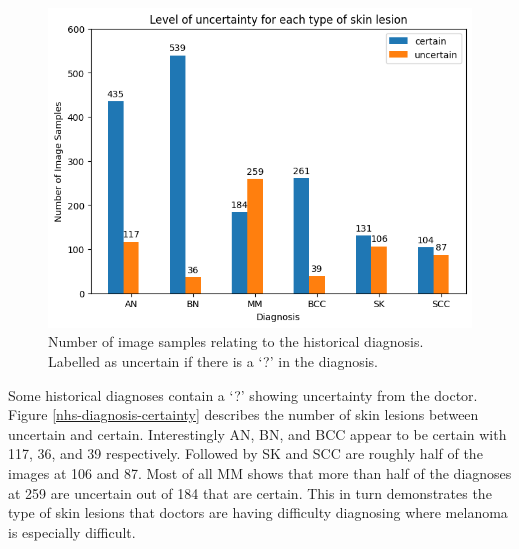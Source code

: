 \begin{figure}
	\centering
	\includegraphics[scale=0.8]{images/nhs/nhs-diagnosis-certainty.png}
	\caption{Number of image samples relating to the historical diagnosis. Labelled as uncertain if there is a `?' in the diagnosis.} 
\end{figure}\label{nhs-diagnosis-certainty}

Some historical diagnoses contain a `?' showing uncertainty from the doctor. Figure \ref{nhs-diagnosis-certainty} describes the number of skin lesions between uncertain and certain. Interestingly AN, BN, and BCC appear to be certain with 117, 36, and 39 respectively. Followed by SK and SCC are roughly half of the images at 106 and 87. Most of all MM shows that more than half of the diagnoses at 259 are uncertain out of 184 that are certain. This in turn demonstrates the type of skin lesions that doctors are having difficulty diagnosing where melanoma is especially difficult.

